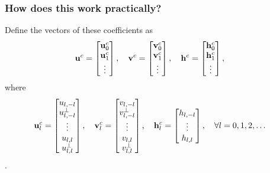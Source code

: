 \documentclass[10pt]{beamer}
\begin{document}
\frame
{
    \frametitle{How does this work practically?}

Define the vectors of these coefficients as 
\begin{align}
\bold{u}^c &= \begin{bmatrix}
			\bold{u}_0^c \\
			\bold{u}_1^c \\
			\vdots \\
		    \end{bmatrix},
\quad
\bold{v}^c = \begin{bmatrix}
			\bold{v}_0^c \\
			\bold{v}_1^c \\
			\vdots \\
		    \end{bmatrix},
\quad
\bold{h}^c = \begin{bmatrix}
			\bold{h}_0^c \\
			\bold{h}_1^c \\
			\vdots \\
		    \end{bmatrix},		  
\end{align}
where
\begin{align}
\bold{u}^c_l &= \begin{bmatrix}
				u_{l,-l} \\
				u^{\perp}_{l,-l} \\
				\vdots \\
				u_{l,l} \\
				u^{\perp}_{l,l}
		        \end{bmatrix},
\quad
\bold{v}^c_l = \begin{bmatrix}
				v_{l,-l} \\
				v^{\perp}_{l,-l} \\
				\vdots \\
				v_{l,l} \\
				v^{\perp}_{l,l}
		        \end{bmatrix},
\quad
\bold{h}^c_l = \begin{bmatrix}
				h_{l,-l} \\
				\vdots \\
				h_{l,l} \\
		        \end{bmatrix},
\quad \forall l = 0, 1, 2, \dots	  
\end{align}.

}
\end{document}
